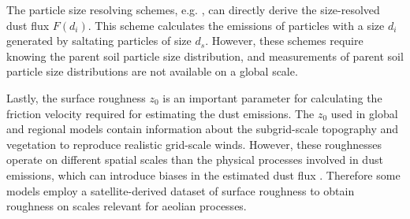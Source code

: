 
The particle size resolving schemes, e.g. \textcite{shao2004simplification}, can directly derive the size-resolved dust flux $F(d_i)$. This scheme calculates the emissions of particles with a size $d_i$ generated by saltating particles of size $d_s$. However, these schemes require knowing the parent soil particle size distribution, and measurements of parent soil particle size distributions are not available on a global scale.

Lastly, the surface roughness $z_0$ is an important parameter for calculating the friction velocity required for estimating the dust emissions. The $z_0$ used in global and regional models contain information about the subgrid-scale topography and vegetation to reproduce realistic grid-scale winds. However, these roughnesses operate on different spatial scales than the physical processes involved in dust emissions, which can introduce biases in the estimated dust flux \parencite{darmenova_development_2009}. Therefore some models employ a satellite-derived dataset of surface roughness to obtain roughness on scales relevant for aeolian processes. 


